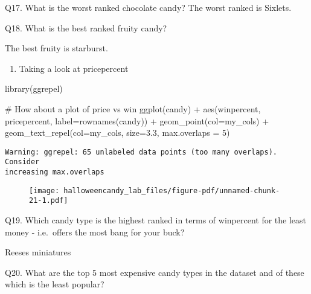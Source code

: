\documentclass[
  letterpaper,
  DIV=11,
  numbers=noendperiod]{scrartcl}
\newenvironment{Shaded}{\begin{snugshade}}{\end{snugshade}}
\newcommand{\AttributeTok}[1]{\textcolor[rgb]{0.40,0.45,0.13}{#1}}
\newcommand{\CommentTok}[1]{\textcolor[rgb]{0.37,0.37,0.37}{#1}}
\newcommand{\ConstantTok}[1]{\textcolor[rgb]{0.56,0.35,0.01}{#1}}
\newcommand{\DecValTok}[1]{\textcolor[rgb]{0.68,0.00,0.00}{#1}}
\newcommand{\FloatTok}[1]{\textcolor[rgb]{0.68,0.00,0.00}{#1}}
\newcommand{\FunctionTok}[1]{\textcolor[rgb]{0.28,0.35,0.67}{#1}}
\newcommand{\NormalTok}[1]{\textcolor[rgb]{0.00,0.23,0.31}{#1}}
\newcommand{\OtherTok}[1]{\textcolor[rgb]{0.00,0.23,0.31}{#1}}
\newcommand{\SpecialCharTok}[1]{\textcolor[rgb]{0.37,0.37,0.37}{#1}}
\providecommand{\tightlist}{%
  \setlength{\itemsep}{0pt}\setlength{\parskip}{0pt}}\usepackage{longtable,booktabs,array}
\begin{document}
Q17. What is the worst ranked chocolate candy? The worst ranked is
Sixlets.

Q18. What is the best ranked fruity candy?

The best fruity is starburst.

\begin{enumerate}
\def\labelenumi{\arabic{enumi}.}
\setcounter{enumi}{3}
\tightlist
\item
  Taking a look at pricepercent
\end{enumerate}

\begin{Shaded}
\begin{Highlighting}[]
\FunctionTok{library}\NormalTok{(ggrepel)}

\CommentTok{\# How about a plot of price vs win}
\FunctionTok{ggplot}\NormalTok{(candy) }\SpecialCharTok{+}
  \FunctionTok{aes}\NormalTok{(winpercent, pricepercent, }\AttributeTok{label=}\FunctionTok{rownames}\NormalTok{(candy)) }\SpecialCharTok{+}
  \FunctionTok{geom\_point}\NormalTok{(}\AttributeTok{col=}\NormalTok{my\_cols) }\SpecialCharTok{+} 
  \FunctionTok{geom\_text\_repel}\NormalTok{(}\AttributeTok{col=}\NormalTok{my\_cols, }\AttributeTok{size=}\FloatTok{3.3}\NormalTok{, }\AttributeTok{max.overlaps =} \DecValTok{5}\NormalTok{)}
\end{Highlighting}
\end{Shaded}

\begin{verbatim}
Warning: ggrepel: 65 unlabeled data points (too many overlaps). Consider
increasing max.overlaps
\end{verbatim}

\begin{figure}[H]

{\centering \texttt{[image: halloweencandy\_lab\_files/figure-pdf/unnamed-chunk-21-1.pdf]}

}

\end{figure}

Q19. Which candy type is the highest ranked in terms of winpercent for
the least money - i.e.~offers the most bang for your buck?

Reeses miniatures

Q20. What are the top 5 most expensive candy types in the dataset and of
these which is the least popular?

\begin{Shaded}
\end{Shaded}
\end{document}
